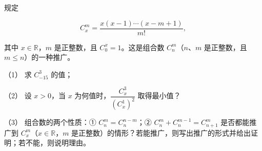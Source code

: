 \begin{question}
规定

\nopagebreak[4]
\[
C_x^m=\frac{x(x-1)\cdots(x-m+1)}{m!},
\]

其中 $x\in\mathbb R$，$m$ 是正整数，且 $C_0^x=1$。这是组合数 $C_n^m$（$n\text{、}m$ 是正整数，且 $m\le n$）的一种推广。

（1） 求 $C_{-15}^3$ 的值；

（2） 设 $x>0$，当 $x$ 为何值时，$\dfrac{C_x^3}{(C_x^1)^2}$ 取得最小值？

（3） 组合数的两个性质：① $C_n^m=C_n^{n-m}$；② $C_n^m+C_n^{m-1}=C_{n+1}^m$ 是否都能推广到 $C_x^m$（$x\in\mathbb R$，$m$ 是正整数）的情形？若能推广，则写出推广的形式并给出证明；若不能，则说明理由。

\end{question}
